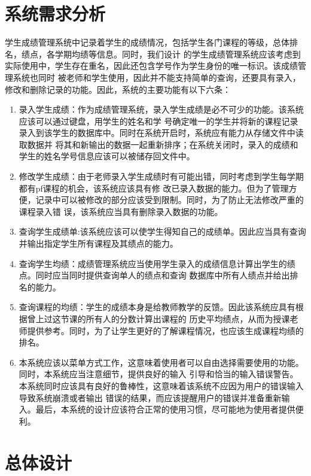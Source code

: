 \documentclass[fontset=windows]{article}
\begin{document}
\section{系统需求分析}
学生成绩管理系统中记录着学生的成绩情况，包括学生各门课程的等级，总体排名，绩点，各学期均绩等信息。同时，我们设计
的学生成绩管理系统应该考虑到实际使用中，学生存在重名，因此还包含学号作为学生身份的唯一标识。该成绩管理系统也同时
被老师和学生使用，因此并不能支持简单的查询，还要具有录入，修改和删除记录的功能。因此，系统的主要功能有以下六条：
\begin{enumerate}
	\item 录入学生成绩：作为成绩管理系统，录入学生成绩是必不可少的功能。该系统应该可以通过键盘，用学生的姓名和学
	号确定唯一的学生并将新的课程记录录入到该学生的数据库中。同时在系统开启时，系统应有能力从存储文件中读取数据并
	将其和新输出的数据一起重新排序；在系统关闭时，录入的成绩和学生的姓名学号信息应该可以被储存回文件中。
	\item 修改学生成绩：由于老师录入学生成绩时有可能出错，同时考虑到学生每学期都有pf课程的机会，该系统应该具有修
	改已录入数据的能力。但为了管理方便，记录中可以被修改的部分应该受到限制。同时，为了防止无法修改严重的课程录入错
	误，该系统应当具有删除录入数据的功能。
	\item 查询学生成绩单:该系统应该可以使学生得知自己的成绩单。因此应当具有查询并输出指定学生所有课程及其绩点的能力。
	\item 查询学生均绩：成绩管理系统应当使用学生录入的成绩信息计算出学生的绩点。同时应当同时提供查询单人的绩点和查询
	数据库中所有人绩点并给出排名的能力。 
	\item 查询课程的均绩：学生的成绩本身是给教师教学的反馈。因此该系统应具有根据曾上过这节课的所有人的分数计算出课程的
	历史平均绩点，从而为授课老师提供参考。同时，为了让学生更好的了解课程情况，也应该生成课程均绩的排名。
	\item 本系统应该以菜单方式工作，这意味着使用者可以自由选择需要使用的功能。同时，本系统应当注意细节，提供良好的输入
	引导和恰当的输入错误警告。本系统同时应该具有良好的鲁棒性，这意味着该系统不应因为用户的错误输入导致系统崩溃或者输出
	错误的结果，而应该提醒用户的错误并准备重新输入。最后，本系统的设计应该符合正常的使用习惯，尽可能地为使用者提供便利。
\end{enumerate}
\newpage



\section{总体设计}
\end{document}
